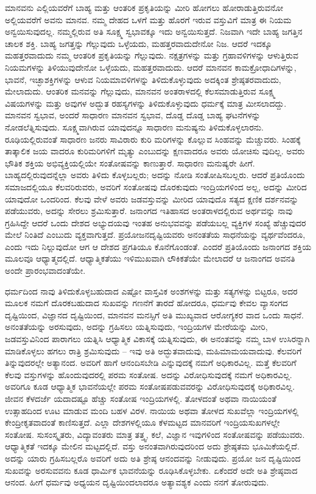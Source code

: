 ಮಾನವನು ಎಲ್ಲಿಯವರೆಗೆ ಬಾಹ್ಯ ಮತ್ತು ಆಂತರಿಕ ಪ್ರಕೃತಿಯನ್ನು ಮೀರಿ ಹೋಗಲು ಹೋರಾಡುತ್ತಿರುವನೋ ಅಲ್ಲಿಯವರೆಗೆ ಅವನು ಮಾನವ. ನಮ್ಮ ದೇಹದ ಒಳಗೆ ಮತ್ತು ಹೊರಗೆ ಇರುವ ವಸ್ತುವಿಗೆ ಮಾತ್ರ ಈ ನಿಯಮ ಅನ್ವಯಿಸುವುದಲ್ಲ. ನಮ್ಮಲ್ಲಿರುವ ಅತಿ ಸೂಕ್ಷ್ಮ ಸ್ವಭಾವಕ್ಕೂ ಇದು ಅನ್ವಯಿಸುತ್ತದೆ. ನಿಜವಾಗಿ ಇದೇ ಬಾಹ್ಯ ಜಗತ್ತಿನ ಚಾಲಕ ಶಕ್ತಿ. ಬಾಹ್ಯ ಜಗತ್ತನ್ನು ಗೆಲ್ಲುವುದು ಒಳ್ಳೆಯದು, ಮಹತ್ತರವಾದುದೇನೋ ನಿಜ. ಆದರೆ ಇದಕ್ಕೂ ಮಹತ್ತರವಾದುದು ನಮ್ಮ ಆಂತರಿಕ ಪ್ರಕೃತಿಯನ್ನು ಗೆಲ್ಲುವುದು. ನಕ್ಷತ್ರಗಳನ್ನು ಮತ್ತು ಗ್ರಹಾವಳಿಗಳನ್ನು ಆಳುತ್ತಿರುವ ನಿಯಮಗಳನ್ನು ತಿಳಿಯುವುದೇನೋ ಒಳ್ಳೆಯದು, ಮಹತ್ತರವಾದುದು. ಆದರೆ ಮಾನವನ ಕಾಮಕ್ರೋಧಾದಿಗಳನ್ನು, ಭಾವನೆ, ಇಚ್ಛಾಶಕ್ತಿಗಳನ್ನು ಆಳುವ ನಿಯಮಾವಳಿಗಳನ್ನು ತಿಳಿದುಕೊಳ್ಳುವುದು ಅದಕ್ಕಿಂತ ಶ್ರೇಷ್ಠತರವಾದುದು, ಮೇಲಾದುದು. ಆಂತರಿಕ ಮನವನ್ನು ಗೆಲ್ಲುವುದು, ಮಾನವನ ಅಂತರಾಳದಲ್ಲಿ ಕೆಲಸಮಾಡುತ್ತಿರುವ ಸೂಕ್ಷ್ಮ ವಿಷಯಗಳನ್ನು ಮತ್ತು ಅವುಗಳ ಅದ್ಭುತ ರಹಸ್ಯಗಳನ್ನು ತಿಳಿದುಕೊಳ್ಳುವುದು ಧರ್ಮಕ್ಕೆ ಮಾತ್ರ ಮೀಸಲಾದದ್ದು. ಮಾನವನ ಸ್ವಭಾವ, ಅಂದರೆ ಸಾಧಾರಣ ಮಾನವನ ಸ್ವಭಾವ, ದೊಡ್ಡ ದೊಡ್ಡ ಬಾಹ್ಯ ಘಟನೆಗಳನ್ನು ನೋಡಲೆತ್ನಿಸುವುದು. ಸೂಕ್ಷ್ಮವಾಗಿರುವ ಯಾವುದನ್ನೂ ಸಾಧಾರಣ ಮನುಷ್ಯನು ತಿಳಿದುಕೊಳ್ಳಲಾರನು. ರೂಢಿಯಲ್ಲಿರುವಂತೆ ಸಾಧಾರಣ ಜನರು ಸಾವಿರಾರು ಕುರಿ ಮರಿಗಳನ್ನು ಕೊಲ್ಲುವ ಸಿಂಹವನ್ನು ಮೆಚ್ಚುವರು. ಸಿಂಹಕ್ಕೆ ತಾತ್ಕಾಲಿಕ ಜಯ ವಾದರೂ ಕುರಿಮರಿಗಳಿಗೆ ಮೃತ್ಯು ಎಂಬುದನ್ನು ಕ್ಷಣವಾದರೂ ಅವರು ಯೋಚಿಸು ವುದಿಲ್ಲ. ಅವರು ಭೌತಿಕ ಶಕ್ತಿಯ ಅಭಿವ್ಯಕ್ತಿಯಲ್ಲಿಯೇ ಸಂತೋಷವನ್ನು ಕಾಣುತ್ತಾರೆ. ಸಾಧಾರಣ ಮನುಷ್ಯರೇ ಹೀಗೆ. ಬಾಹ್ಯದಲ್ಲಿರುವುದನ್ನೆಲ್ಲಾ ಅವರು ತಿಳಿದು ಕೊಳ್ಳಬಲ್ಲರು; ಅದನ್ನು ನೋಡಿ ಸಂತೋಷಿಸಬಲ್ಲರು. ಆದರೆ ಪ್ರತಿಯೊಂದು ಸಮಾಜದಲ್ಲಿಯೂ ಕೆಲವರಿರುವರು, ಅವರಿಗೆ ಸಂತೋಷವು ದೊರಕುವುದು ಇಂದ್ರಿಯಗಳಿಂದ ಅಲ್ಲ, ಅದನ್ನು ಮೀರಿದ ಯಾವುದೋ ಒಂದರಿಂದ. ಕೆಲವು ವೇಳೆ ಅವರು ಜಡವಸ್ತುವನ್ನು ಮೀರಿದ ಯಾವುದೊ ಸತ್ಯದ ಕ್ಷಣಿಕ ದರ್ಶನವನ್ನು ಪಡೆಯುವರು, ಅದನ್ನು ಸೇರಲು ಶ್ರಮಿಸುತ್ತಾರೆ. ಜನಾಂಗದ ಇತಿಹಾಸದ ಅಂತರಾಳದಲ್ಲಿರುವ ಅರ್ಥವನ್ನು ನಾವು ಗ್ರಹಿಸಿದ್ದೇ ಆದರೆ ಒಂದು ದೇಶದ ಅಭ್ಯುದಯವು ಇಂತಹ ಅನುಭವವನ್ನು ಪಡೆಯಬಲ್ಲ ವ್ಯಕ್ತಿಗಳ ಸಂಖ್ಯೆ ಹೆಚ್ಚುವುದರ ಮೇಲೆ ನಿಂತಿದೆ ಎಂಬುದು ವ್ಯಕ್ತವಾಗುತ್ತದೆ. ಪ್ರಯೋಜನದೃಷ್ಟಿಯವರು ಅನಂತತೆಯ ಸಾಧನೆಯನ್ನು ವ್ಯರ್ಥವೆಂದರೂ, ಎಂದು ಇದು ನಿಲ್ಲುವುದೋ ಆಗ ಆ ದೇಶದ ಪ್ರಗತಿಯೂ ಕೊನೆಗೊಂಡಂತೆ. ಎಂದರೆ ಪ್ರತಿಯೊಂದು ಜನಾಂಗದ ಶಕ್ತಿಯ ಮೂಲವೂ ಆಧ್ಯಾತ್ಮದಲ್ಲಿದೆ. ಆಧ್ಯಾತ್ಮಿಕತೆಯು ಇಳಿಮುಖವಾಗಿ ಲೌಕಿಕತೆಯೇ ಮೇಲಾದರೆ ಆ ಜನಾಂಗದ ಅವನತಿ ಅಂದೇ ಪ್ರಾರಂಭವಾದಂತೆಯೇ.

ಧರ್ಮದಿಂದ ನಾವು ತಿಳಿದುಕೊಳ್ಳಬಹುದಾದ ಎಷ್ಟೋ ವಾಸ್ತವಿಕ ಅಂಶಗಳನ್ನು ಮತ್ತು ಸತ್ಯಗಳನ್ನು ಬಿಟ್ಟರೂ, ಅದರ ಮೂಲಕ ನಮಗೆ ದೊರಕಬಹುದಾದ ಸುಖವನ್ನು ಗಣನೆಗೆ ತಾರದೆ ಹೋದರೂ, ಧರ್ಮವು ಕೇವಲ ವ್ಯಾಸಂಗದ ದೃಷ್ಟಿಯಿಂದ, ವಿಜ್ಞಾನದ ದೃಷ್ಟಿಯಿಂದ, ಮಾನವನ ಮನಸ್ಸಿಗೆ ಅತಿ ಮುಖ್ಯವಾದ ಆರೋಗ್ಯಕರ ವಾದ ಒಂದು ಸಾಧನೆ. ಅನಂತತೆಯನ್ನು ಅರಸುವುದು, ಅದನ್ನು ಗ್ರಹಿಸಲು ಯತ್ನಿಸುವುದು, ಇಂದ್ರಿಯಗಳ ಮೇರೆಯನ್ನು ಮೀರಿ, ಜಡವಸ್ತುವಿನಿಂದ ಪಾರಾಗಲು ಯತ್ನಿಸಿ ಆಧ್ಯಾತ್ಮಿಕ ವಿಕಾಸಕ್ಕೆ ಯತ್ನಿಸುವುದು, ಈ ಅನಂತವನ್ನು ನಮ್ಮ ಬಾಳ ಉಸಿರನ್ನಾಗಿ ಮಾಡಿಕೊಳ್ಳಲು ಹಗಲು ರಾತ್ರಿ ಶ್ರಮಿಸುವುದು – ಇವು ಅತಿ ಅದ್ಭುತವಾದುವು, ಮಹಿಮಾಮಯವಾದುವು. ಕೆಲವರಿಗೆ ತಿನ್ನುವುದರಲ್ಲೇ ಅತ್ಯಾನಂದ. ಅವರಿಗೆ ಹಾಗೆ ಆನಂದಿಸಬೇಡಿ ಎನ್ನುವುದಕ್ಕೆ ನಮಗೆ ಅಧಿಕಾರವಿಲ್ಲ. ಮತ್ತೆ ಕೆಲವರಿಗೆ ಕೆಲವು ವಸ್ತುಗಳನ್ನು ಹೊಂದುವುದರಲ್ಲಿ ಪರಮ ಸಂತೋಷ. ಅದನ್ನು ವಿರೋಧಿಸುವುದಕ್ಕೆ ನಮಗೆ ಅಧಿಕಾರವಿಲ್ಲ. ಅವರಿಗೂ ಕೂಡ ಆಧ್ಯಾತ್ಮಿಕ ಭಾವನೆಯಲ್ಲೇ ಪರಮ ಸಂತೋಷಪಡುವವರನ್ನು ವಿರೋಧಿಸುವುದಕ್ಕೆ ಅಧಿಕಾರವಿಲ್ಲ. ಜೀವನ ಕೆಳದರ್ಜೆ ಯದಾದಷ್ಟೂ ಹೆಚ್ಚು ಸಂತೋಷ ಇಂದ್ರಿಯಗಳಲ್ಲಿ. ತೋಳದಂತೆ ಅಥವಾ ನಾಯಿಯಂತೆ ಉತ್ಸಾಹದಿಂದ ಊಟ ಮಾಡುವ ಮಂದಿ ಬಹಳ ವಿರಳ. ನಾಯಿಯ ಅಥವಾ ತೋಳದ ಸುಖವೆಲ್ಲಾ ಇಂದ್ರಿಯಗಳಲ್ಲಿ ಕೇಂದ್ರೀಕೃತವಾದಂತೆ ಕಾಣಿಸುತ್ತದೆ. ಎಲ್ಲಾ ದೇಶಗಳಲ್ಲಿಯೂ ಕೆಳಮಟ್ಟದ ಮಾನವರಿಗೆ ಇಂದ್ರಿಯಸುಖಗಳಲ್ಲೇ ಸಂತೋಷ. ಸುಸಂಸ್ಕೃತರು, ವಿದ್ಯಾವಂತರು ಮಾತ್ರ ತತ್ತ್ವ, ಕಲೆ, ವಿಜ್ಞಾನ ಇವುಗಳಿಂದ ಸಂತೋಷವನ್ನು ಪಡೆಯುವರು. ಆಧ್ಯಾತ್ಮಿಕತೆ ಇದಕ್ಕೂ ಮೇಲಿನ ಮಟ್ಟದಲ್ಲಿದೆ. ವಸ್ತು ಅನಂತವಾಗಿರುವುದರಿಂದ ಅದು ಶ್ರೇಷ್ಠತಮ ಭೂಮಿಕೆಯಲ್ಲಿದೆ. ಅದನ್ನು ಯಾರು ಗ್ರಹಿಸಬಲ್ಲರೊ ಅವರಿಗೆ ಅದು ಅತಿ ಶ್ರೇಷ್ಠ ಆನಂದವನ್ನು ನೀಡುವುದು. ಪ್ರಯೋ ಜನ ದೃಷ್ಟಿಯಿಂದ ಸುಖವನ್ನು ಅರಸುವವನು ಕೂಡ ಧಾರ್ಮಿಕ ಭಾವನೆಯನ್ನು ರೂಢಿಸಿಕೊಳ್ಳಬೇಕು. ಏಕೆಂದರೆ ಅದೇ ಅತಿ ಶ್ರೇಷ್ಠವಾದ ಆನಂದ. ಹೀಗೆ ಧರ್ಮವು ಅಧ್ಯಯನ ದೃಷ್ಟಿಯಿಂದಲಾದರೂ ಅತ್ಯಾವಶ್ಯಕ ಎಂದು ನನಗೆ ತೋರುವುದು.

